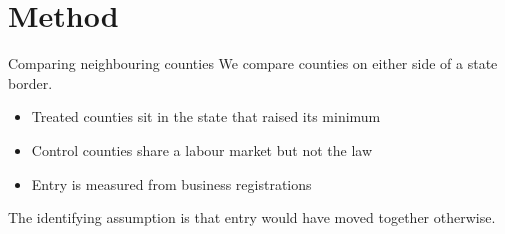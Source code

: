\section{Method}

\begin{frame}{Comparing neighbouring counties}
We compare counties on either side of a state border.

\begin{itemize}
  \item Treated counties sit in the state that raised its minimum
  \item Control counties share a labour market but not the law
  \item Entry is measured from business registrations
\end{itemize}

The identifying assumption is that entry would have moved together otherwise.
\end{frame}
